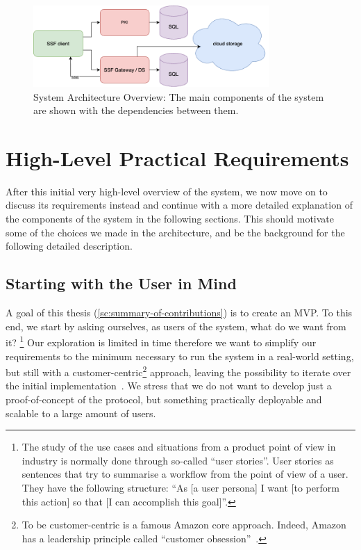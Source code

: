 \begin{figure}
    \centering
    \includegraphics[width=0.8\textwidth]{figures/architecture.png}
    \caption{System Architecture Overview: The main components of the system are shown with the dependencies between them.}
    \label{fig:architecture}
\end{figure}

\section{High-Level Practical Requirements}\label{sc:requirements}

After this initial very high-level overview of the system, we
now move on to discuss its requirements instead and continue with a more
detailed explanation of the components of the system in the following sections.
This should motivate some of the choices we made in the architecture,
and be the background for the following detailed description.

\subsection{Starting with the User in Mind}\label{sc:real-user}

A goal of this thesis (\cref{sc:summary-of-contributions})
is to create an MVP. To this end, we start by asking ourselves,
as users of the system, what do we want from it?
\footnote{The study of the use cases and situations from a product 
point of view in industry is normally done through so-called ``user stories''.
User stories as sentences that try to summarise a workflow from the
point of view of a user. They have the following structure:
``As [a user persona] I want [to perform this action] so that [I can accomplish this goal]''.}
Our exploration is limited in time therefore we want to simplify
our requirements to the minimum necessary to run the system
in a real-world setting, 
but still with a customer-centric\footnote{To be customer-centric is a famous Amazon core approach. Indeed, Amazon has a leadership principle called ``customer obsession''~\cite{AmazonLeadershipPrinciples}.}
approach, leaving the possibility to iterate over the initial implementation~\cite{ries2011startup}.
We stress that we do not want to develop just a proof-of-concept of the protocol,
but something practically deployable and scalable to a large
amount of users.

